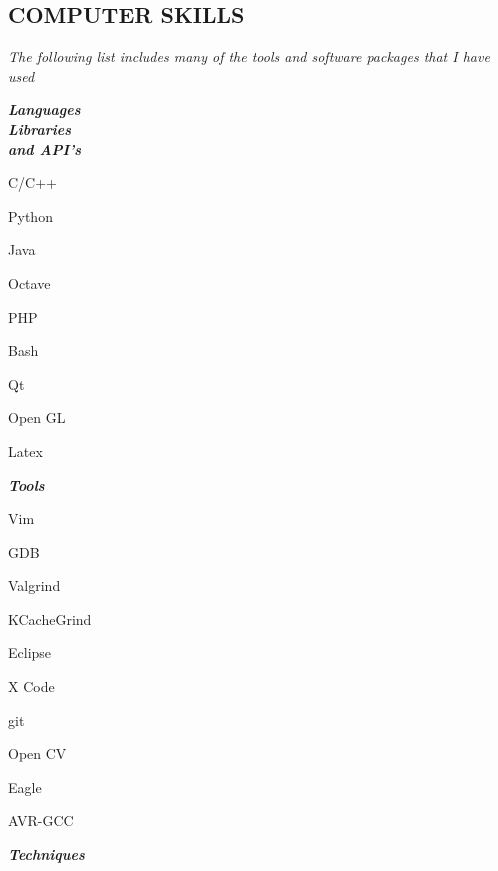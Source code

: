 \documentclass[margin]{res}
\begin{document}
\begin{resume}
\section{COMPUTER SKILLS}{\sl The following list includes many of the tools and software packages that I have used}
									\begin{multicols}{3}[\columnsep 2pt \linewidth 400pt]
									{\sl \textbf{Languages \\ Libraries \\ and API's}} \\
									\begin{list}{}{\leftmargin=1em} \itemsep -2pt
										\item C/C++ 
										\item Python
										\item Java 
										\item Octave 
										\item PHP 
										\item Bash 
										\item Qt 
										\item Open GL
										\item Latex
									\end{list}
									\vfill
									\columnbreak
									{\sl \textbf{Tools}} 
									\linebreak
									\linebreak
									\linebreak
							 		\begin{list}{}{\leftmargin=1em}\itemsep -2pt
										\item Vim 
										\item GDB
										\item Valgrind 
										\item KCacheGrind
										\item Eclipse
										\item X Code 
										\item git 
										\item Open CV 
										\item Eagle 
										\item AVR-GCC
									\end{list} \itemsep -2pt
									\vfill
									\columnbreak
			                		{\sl \textbf{Techniques}} \\ 								
									\linebreak
									\linebreak

\end{multicols}
\end{resume}
\end{document}
